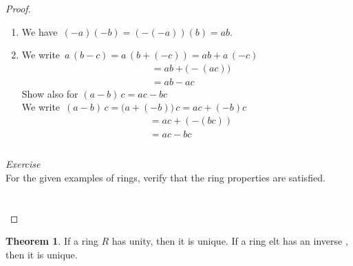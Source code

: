 \documentclass[11pt,a4paper]{article}
\theoremstyle{definition}
\newtheorem{thm}{Theorem}[subsection]
\begin{document}
\begin{proof}
\begin{enumerate}
\begin{enumerate}
\begin{align*}
\begin{bmatrix}
     ck + dm & cl + dn\\
     \end{bmatrix}\\\\
     & = pq + pr\\\\
     \end{align*}
\end{enumerate}














\item We have $\, (-a)(-b) = (- (-a))(b) = ab$.\\

\item We write $\, a\, (b - c)  = a\, (b + (-c)) = ab  + a\, (-c)$
\begin{align*}
& = ab + \big(- (ac)\big)\\
& = ab - ac
\end{align*}
 Show also for $(a - b)\,c = ac - bc$\\
 We write $\,  (a - b)\, c = \big( a + (-b)\big) \, c = ac + (-b)c$
 \begin{align*}
 & = ac + (-(bc))\\
 & = ac - bc\\\\
 \end{align*}
\end{enumerate}







\textit{Exercise}\\
For the given examples of rings, verify that the ring properties are satisfied.\\\\\\
\end{proof}




\begin{thm}
If a ring $R$ has unity, then it is unique. If a ring elt has an inverse , then it is unique.\\
\end{thm}
\end{document}
